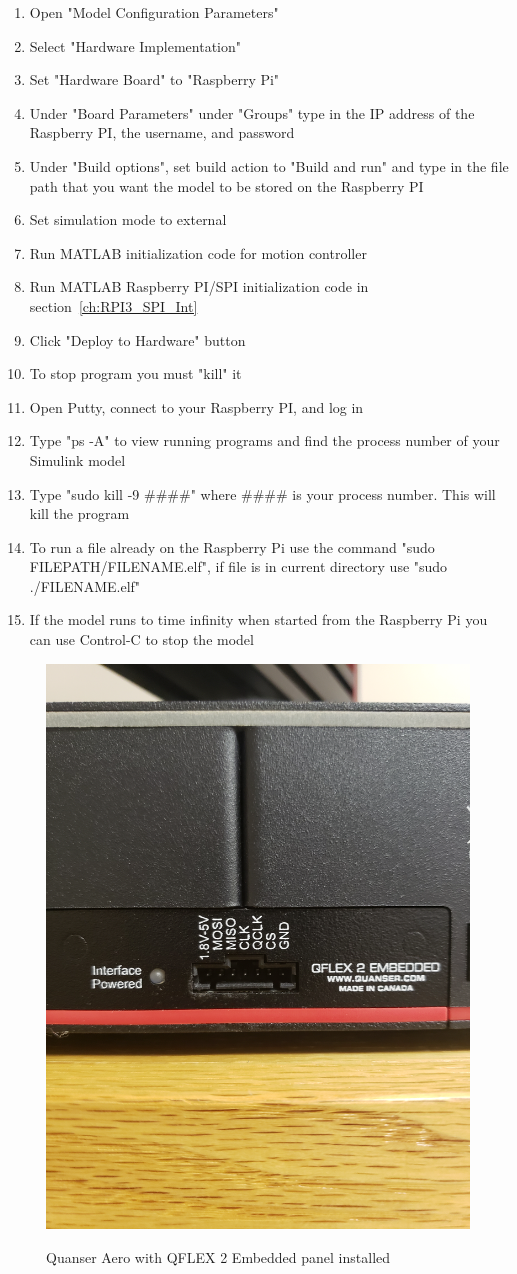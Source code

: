 \begin{enumerate}
    \item Open "Model Configuration Parameters"
    \item Select "Hardware Implementation"
    \item Set "Hardware Board" to "Raspberry Pi"
    \item Under "Board Parameters" under "Groups" type in the IP address of the Raspberry PI, the username, and password
    \item Under "Build options", set build action to "Build and run" and type in the file path that you want the model to be stored on the Raspberry PI
    \item Set simulation mode to external
    \item Run MATLAB initialization code for motion controller
    \item Run MATLAB Raspberry PI/SPI initialization code in section~\ref{ch:RPI3_SPI_Int}
    \item Click "Deploy to Hardware" button
    \item To stop program you must "kill" it
    \item Open Putty, connect to your Raspberry PI, and log in
    \item Type "ps -A" to view running programs and find the process number of your Simulink model
    \item Type "sudo kill -9 \#\#\#\#" where \#\#\#\# is your process number.  This will kill the program
    \item To run a file already on the Raspberry Pi use the command "sudo FILEPATH/FILENAME.elf", if file is in current directory use "sudo ./FILENAME.elf"
    \item If the model runs to time infinity when started from the Raspberry Pi you can use Control-C to stop the model
\end{enumerate}

\begin{figure}[!h]
    \centering
    \includegraphics[angle = 270,width=.248\textwidth,keepaspectratio=true]{figs/img/Embedded_Panel.jpg}
    \label{fig:Embedded_Panel}
    \caption{Quanser Aero with QFLEX 2 Embedded panel installed}
\end{figure}
